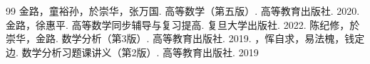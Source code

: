 \documentclass{ctexart}
\begin{document}
\clearpage
\renewcommand{\refname}{References}
\begin{thebibliography}{99}
金路，童裕孙，於崇华，张万国. 高等数学（第五版）. 高等教育出版社. 2020.
金路，徐惠平. 高等数学同步辅导与复习提高. 复旦大学出版社. 2022.
陈纪修，於崇华，金路. 数学分析（第3版）. 高等教育出版社. 2019.
，恽自求，易法槐，钱定边. 数学分析习题课讲义（第2版）. 高等教育出版社. 2019
\end{thebibliography}
\end{document}
